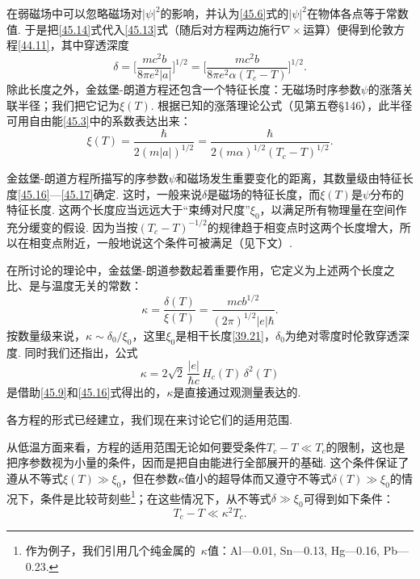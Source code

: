 在弱磁场中可以忽略磁场对$|\psi|^2$的影响，并认为\eqref{45.6}式的$|\psi|^2$在物体各点等于常数值. 于是把\eqref{45.14}式代入\eqref{45.13}式（随后对方程两边施行$\nabla\times$运算）便得到伦敦方程\eqref{44.11}，其中穿透深度
\begin{equation}
\delta = \Biggl[\frac{mc^2b}{8\pi e^2|a|}\Biggr]^{1/2}
= \Biggl[\frac{mc^2b}{8\pi e^2\alpha(T_c-T)}\Biggr]^{1/2}.
\label{45.16}
\end{equation}
除此长度之外，金兹堡-朗道方程还包含一个特征长度：无磁场时序参数$\psi$的涨落关联半径；我们把它记为$\xi(T)$. 根据已知的涨落理论公式（见第五卷§146），此半径可用自由能\eqref{45.3}中的系数表达出来：
\begin{equation}
\xi(T) = \frac{\hbar}{2(m|a|)^{1/2}} = \frac{\hbar}{2(m\alpha)^{1/2}(T_c-T)^{1/2}}.
\label{45.17}
\end{equation}

金兹堡-朗道方程所描写的序参数$\psi$和磁场发生重要变化的距离，其数量级由特征长度\eqref{45.16}—\eqref{45.17}确定. 这时，一般来说$\delta$是磁场的特征长度，而$\xi(T)$是$\psi$分布的特征长度. 这两个长度应当远远大于“束缚对尺度”$\xi_0$，以满足所有物理量在空间作充分缓变的假设. 因为当按$(T_c-T)^{-1/2}$的规律趋于相变点时这两个长度增大，所以在相变点附近，一般地说这个条件可被满足（见下文）.

在所讨论的理论中，金兹堡-朗道参数起着重要作用，它定义为上述两个长度之比、是与温度无关的常数：
\begin{equation}
\kappa = \frac{\delta(T)}{\xi(T)} = \frac{mcb^{1/2}}{(2\pi)^{1/2}|e|\hbar}.
\label{45.18}
\end{equation}
按数量级来说，$\kappa\sim\delta_0/\xi_0$，这里$\xi_0$是相干长度\eqref{39.21}，$\delta_0$为绝对零度时伦敦穿透深度. 同时我们还指出，公式
\begin{equation}
\kappa = 2\sqrt2\,\frac{|e|}{\hbar c}\,H_c(T)\,\delta^2(T)
\label{45.19}
\end{equation}
是借助\eqref{45.9}和\eqref{45.16}式得出的，$\kappa$是直接通过观测量表达的.

各方程的形式已经建立，我们现在来讨论它们的适用范围.

从低温方面来看，方程的适用范围无论如何要受条件$T_c-T\ll T_c$的限制，这也是把序参数视为小量的条件，因而是把自由能进行全部展开的基础. 这个条件保证了遵从不等式$\xi(T)\gg\xi_0$，但在参数$\kappa$值小的超导体而又遵守不等式$\delta(T)\gg\xi_0$的情况下，条件是比较苛刻些\footnote{作为例子，我们引用几个纯金属的~$\kappa$值：Al---0.01, Sn---0.13, Hg---0.16, Pb---0.23.}；在这些情况下，从不等式$\delta\gg\xi_0$可得到如下条件：
\begin{equation}
T_c - T \ll \kappa^2 T_c.
\label{45.20}
\end{equation}

